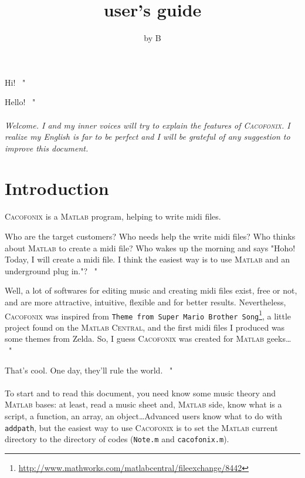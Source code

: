 \documentclass{article}
\title{\cacofonix user's guide}
\author{by B}
\date{}
\newcommand\cacofonix{\textsc{Cacofonix}\xspace}
\newcommand\matlab{\textsc{Matlab}\xspace}
\newcommand\noteFile{\texttt{Note.m}\xspace}
\newcommand\cacofonixFile{\texttt{cacofonix.m}\xspace}
\newcommand\exchange[2]{\texttt{#1}\footnote{\url{#2}}\xspace}
\newenvironment{meenv}{ \par \noindent \makebox[6em][r]{ \textcolor{mecolor}{Me}: " --~}}{~"}
\newenvironment{myselfenv}{ \par \noindent \makebox[6em][r]{ \textcolor{myselfcolor}{Myself}: " --~}}{~"}
\newcommand{ \me }[1]{%
\begin{meenv}%
	#1%
\end{meenv} }
\newcommand{ \myself }[1]{%
\begin{myselfenv}%
	#1%
\end{myselfenv} }
\begin{document}
\maketitle

\me{ Hi! }
\myself{ Hello! }

\paragraph{}

\emph{Welcome. I and my inner voices will try to explain the features of \cacofonix. I realize my English is far to be perfect and I will be grateful of any suggestion to improve this document.}

\tableofcontents

\section{Introduction}

\cacofonix is a \matlab program, helping to write midi files.

\me{ Who are the target customers? Who needs help the write midi files? Who thinks about \matlab to create a midi file? Who wakes up the morning and says "Hoho! Today, I will create a midi file. I think the easiest way is to use \matlab and an underground plug in."? }
\myself{ Well, a lot of softwares for editing music and creating midi files exist, free or not, and are more attractive, intuitive, flexible and for better results. Nevertheless, \cacofonix was inspired from \exchange{Theme from Super Mario Brother Song}{http://www.mathworks.com/matlabcentral/fileexchange/8442}, a little project found on the \textsc{Matlab Central}, and the first midi files I produced was some themes from Zelda. So, I guess \cacofonix was created for \matlab geeks\dots }
\me{ That's cool. One day, they'll rule the world. }

\paragraph{}

To start and to read this document, you need know some music theory and \matlab bases: at least, read a music sheet and, \matlab side, know what is a script, a function, an array, an object\dots Advanced users know what to do with \lstinline!addpath!, but the easiest way to use \cacofonix is to set the \matlab current directory to the directory of codes (\noteFile and \cacofonixFile).
\end{document}
